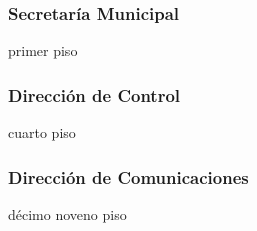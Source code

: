 \subsubsection{Secretaría Municipal}
 {primer piso}

\subsubsection{Dirección de Control}
 {cuarto piso}

\subsubsection{Dirección de Comunicaciones}
 {décimo noveno piso}
